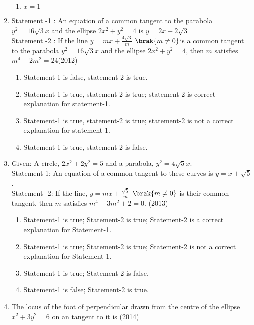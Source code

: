 \begin{enumerate}[label=\thesubsection.\arabic*.,ref=\thesubsection.\theenumi]
\begin{multicols}{4}
\begin{enumerate}
    \item $x=1$
\end{enumerate}
\end{multicols}
\item Statement -1 : An equation of a common tangent to the  parabola $y^2=16\sqrt{3}x$ and the ellipse $2x^2+y^2=4$ is $y=2x+2\sqrt{3}$\\
Statement -2 : If the line $y=mx+\frac{4\sqrt{3}}{m}$ $\brak{m \neq 0}$is a common tangent to the parabola $y^2=16\sqrt{3}x$ and the ellipse $2x^2+y^2=4$, then $m$ satisfies $m^4+2m^2=24$\hfill(2012)
\begin{multicols}{2}
\begin{enumerate}
    \item Statement-1 is false, statement-2 is true.
    \item Statement-1 is true,  statement-2 is true; statement-2 is correct explanation for statement-1.
    \item Statement-1 is true, statement-2 is true; statement-2 is not a correct explanation for statement-1.
    \item Statement-1 is true, statement-2 is false.
\end{enumerate}
\end{multicols}
\item {Given: A circle, $2x^2+2y^2=5$ and a parabola, $y^2=4\sqrt{5}x$.\\
Statement-1: An equation of a common tangent to these curves is $y=x+\sqrt{5}$.\\
Statement -2: If the line, $y=mx+\frac{\sqrt{5}}{m}$ $\brak{m \neq 0}$ is their common tangent, then $m$ satisfies $m^4-3m^2+2=0$.}
\hfill(2013)
\begin{multicols}{2}
\begin{enumerate}
    \item Statement-1 is true; Statement-2 is true; Statement-2 is a correct explanation for Statement-1.
    \item Statement-1 is true; Statement-2 is true; Statement-2 is not a correct explanation for Statement-1.
    \item Statement-1 is true; Statement-2 is false.
    \item Statement-1 is false; Statement-2 is true.
\end{enumerate}
\end{multicols}
\item The locus of the foot of perpendicular drawn from the centre of the ellipse $x^2+3y^2=6$ on an tangent to it is
\hfill(2014)

\end{enumerate}
